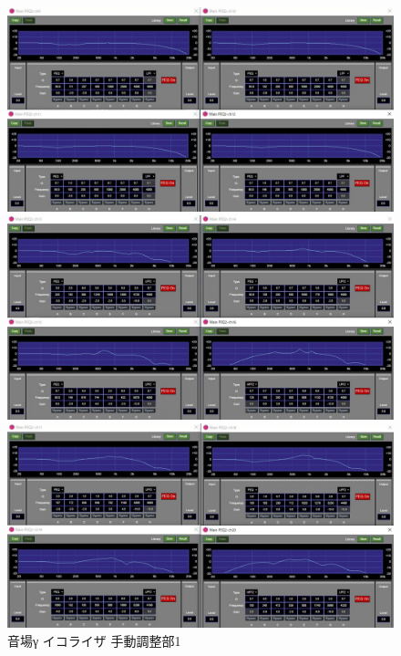 \documentclass[11pt,a4j]{jreport}
\begin{document}
\begin{figure}[H]
  \begin{minipage}[b]{.5\linewidth}
    \centering
    \includegraphics[width=.9\linewidth]{images/experimentField/afcParameters/03gamma/04manualEQ3.jpg}
  \end{minipage}%
  \begin{minipage}[b]{.5\linewidth}
    \centering
    \includegraphics[width=.9\linewidth]{images/experimentField/afcParameters/03gamma/04manualEQ4.jpg}
  \end{minipage}

  \begin{minipage}[b]{1\linewidth}
    \centering
    \includegraphics[width=.45\linewidth]{images/experimentField/afcParameters/03gamma/04manualEQ5.jpg}
  \end{minipage}

  \centering
  \caption{音場γ イコライザ 手動調整部1}
  \label{fig:gammaイコライザ手動調整部1}
\end{figure}
\end{document}

